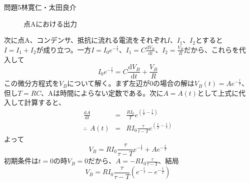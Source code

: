 \documentclass[fleqn]{jbook}
\begin{document}
\begin{answer}{問題5}{林寛仁・太田良介}
\begin{enumerate}
\begin{enumerate}
	\begin{figure}[h]
  		\begin{center}
    	\caption{点Aにおける出力}
  		\end{center}
	\end{figure}
	次に点A、コンデンサ、抵抗に流れる電流をそれぞれ$I$、$I_1$、$I_2$とすると$I=I_1+I_2$が成り立つ。一方$I=I_0 e^{-\frac{t}{\tau}}$、$I_1=C\frac{\mathrm{d}V_B}{\mathrm{d}t}$、$I_2=\frac{V_B}{R}$だから、これらを代入して
\begin{equation}
	I_0 e^{-\frac{t}{\tau}}=C\frac{\mathrm{d}V_B}{\mathrm{d}t}
		+\frac{V_B}{R}								\nonumber
\end{equation}
この微分方程式を$V_B$について解く。まず左辺が0の場合の解は$V_B(t)=A e^{-\frac{t}{T}}$、但し$T=RC$、Aは時間によらない定数である。次に$A=A(t)$として上式に代入して計算すると、
\begin{eqnarray}
	\frac{\mathrm{d}A}{\mathrm{d}t}&=&\frac{RI_0}{T}
		e^{\left(\frac{t}{T}-\frac{t}{\tau}\right)}	\nonumber\\
	\therefore \ \ A(t)&=&RI_0\frac{\tau}{\tau -T}
		e^{\left(\frac{t}{T}-\frac{t}{\tau}\right)}	\nonumber
\end{eqnarray}
よって
\begin{equation}
	V_B=RI_0\frac{\tau}{\tau -T}
		e^{-\frac{t}{\tau}}
		+Ae^{-\frac{t}{T}}							\nonumber
\end{equation}
初期条件は$t=0$の時$V_B=0$だから、$A=-RI_0\frac{\tau}{\tau -T}$、結局
\begin{equation}
	V_B=RI_0\frac{\tau}{\tau -T}\left(
		e^{-\frac{t}{\tau}}
		-e^{-\frac{t}{T}}\right)					\nonumber

\end{equation}
\end{enumerate}
\end{enumerate}
\end{answer}
\end{document}
